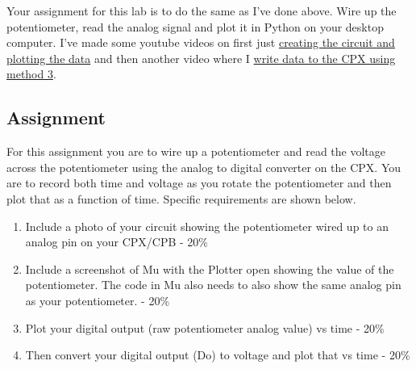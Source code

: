 Your assignment for this lab is to do the same as I’ve done above. Wire up the potentiometer, read the analog signal and plot it in Python on your desktop computer. I’ve made some youtube videos on first just \href{https://youtu.be/_gnDvPOvPqk}{creating the circuit and plotting the data} and then another video where I \href{https://youtu.be/9UF3OVUIYjU}{write data to the CPX using method 3}.

\subsection{Assignment}

For this assignment you are to wire up a potentiometer and read the voltage across the potentiometer using the analog to digital converter on the CPX. You are to record both time and voltage as you rotate the potentiometer and then plot that as a function of time. Specific requirements are shown below.



\begin{enumerate}[itemsep=-5pt]
\item Include a photo of your circuit showing the potentiometer wired up to an analog pin on your CPX/CPB - 20\%
\item Include a screenshot of Mu with the Plotter open showing the value of the potentiometer. The code in Mu also needs to also show the same analog pin as your potentiometer. - 20\%
\item Plot your digital output (raw potentiometer analog value) vs time - 20\%
\item Then convert your digital output (Do) to voltage and plot that vs time - 20\% 
\end{enumerate}
